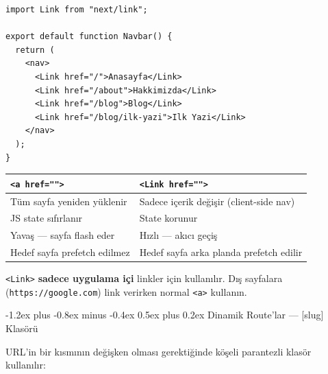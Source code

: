 \documentclass[12pt, a4paper]{article}
\makeatletter
\renewcommand{\subsection}{%
  \@startsection{subsection}{2}{\z@}%
    {-1.2ex plus -0.8ex minus -0.4ex}%
    {0.5ex plus 0.2ex}%
    {\normalfont\large\bfseries\sffamily\color{secondary}}%
}
\makeatother
\begin{document}
\begin{tcolorbox}[enhanced, colback=codebg, colframe=gray!30,
    colbacktitle=primary!85!black, coltitle=white, arc=4pt,
    title={\sffamily\bfseries\small Link Kullanımı}]
\begin{lstlisting}[style=jsxstyle]
import Link from "next/link";

export default function Navbar() {
  return (
    <nav>
      <Link href="/">Anasayfa</Link>
      <Link href="/about">Hakkimizda</Link>
      <Link href="/blog">Blog</Link>
      <Link href="/blog/ilk-yazi">Ilk Yazi</Link>
    </nav>
  );
}
\end{lstlisting}
\end{tcolorbox}

\vspace{6pt}

\begin{tcolorbox}[enhanced, colback=lightbg, colframe=gray!30, arc=4pt]
\sffamily\small
\begin{tabularx}{\textwidth}{X X}
\toprule
\bfseries \texttt{<a href="">} & \bfseries \texttt{<Link href="">} \\
\midrule
Tüm sayfa yeniden yüklenir & Sadece içerik değişir (client-side nav) \\
JS state sıfırlanır & State korunur \\
Yavaş --- sayfa flash eder & Hızlı --- akıcı geçiş \\
Hedef sayfa prefetch edilmez & Hedef sayfa arka planda prefetch edilir \\
\bottomrule
\end{tabularx}
\end{tcolorbox}

\vspace{6pt}

\begin{warningbox}
\texttt{<Link>} \textbf{sadece uygulama içi} linkler için kullanılır.
Dış sayfalara (\texttt{https://google.com}) link verirken normal
\texttt{<a>} kullanın.
\end{warningbox}

\newpage
\subsection{Dinamik Route'lar --- {[slug]} Klasörü}

URL'in bir kısmının değişken olması gerektiğinde köşeli parantezli
klasör kullanılır:
\end{document}
